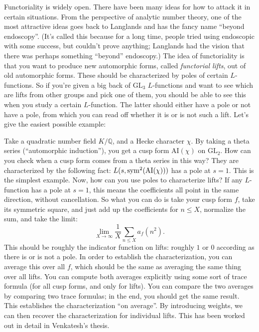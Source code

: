 \documentclass[reqno]{amsart} 
\numberwithin{theorem}{section}
\numberwithin{equation}{section}
\begin{document}
Functoriality is widely open.  There have been many ideas for how to attack it in certain situations.  From the perspective of analytic number theory, one of the most attractive ideas goes back to Langlands and has the fancy name ``beyond endoscopy''.  (It's called this because for a long time, people tried using endoscopic with some success, but couldn't prove anything; Langlands had the vision that there was perhaps something ``beyond'' endoscopy.)  The idea of functoriality is that you want to produce new automorphic forms, called \emph{functorial lifts}, out of old automorphic forms.  These should be characterized by poles of certain $L$-functions.  So if you're given a big back of $\mathrm{GL}_3$ $L$-functions and want to see which are lifts from other groups and pick one of them, you should be able to see this when you study a certain $L$-function.  The latter should either have a pole or not have a pole, from which you can read off whether it is or is not such a lift.  Let's give the easiest possible example:
\begin{example}
  Take a quadratic number field $K / \mathbb{Q}$, and a Hecke character $\chi$.  By taking a theta series (``automorphic induction''), you get a cusp form $\mathrm{AI}(\chi)$ on $\mathrm{GL}_2$.  How can you check when a cusp form comes from a theta series in this way?  They are characterized by the following fact: $L(s, \operatorname{sym}^2(\mathrm{AI}(\chi)))$ has a pole at $s = 1$.  This is the simplest example.  Now, how can you use poles to characterize lifts?  If any $L$-function has a pole at $s =1$, this means the coefficients all point in the same direction, without cancellation.  So what you can do is take your cusp form $f$, take its symmetric square, and just add up the coefficients for $n \leq X$, normalize the sum, and take the limit:
  \begin{equation*}
    \lim_{X \rightarrow \infty} \frac{1}{X} \sum_{n \leq X} a_f(n^2).
  \end{equation*}
  This should be roughly the indicator function on lifts: roughly $1$ or $0$ according as there is or is not a pole.  In order to establish the characterization, you can average this over all $f$, which should be the same as averaging the same thing over all lifts.  You can compute both averages explicitly using some sort of trace formula (for all cusp forms, and only for lifts).  You can compare the two averages by comparing two trace formulas; in the end, you should get the same result.  This establishes the characterization ``on average''.  By introducing weights, we can then recover the characterization for individual lifts.  This has been worked out in detail in Venkatesh's thesis.
\end{example}
\end{document}
